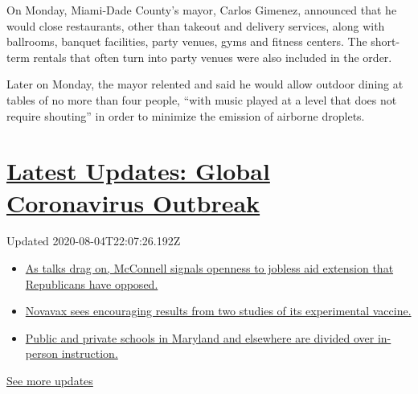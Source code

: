 On Monday, Miami-Dade County's mayor, Carlos Gimenez, announced that he
would close restaurants, other than takeout and delivery services, along
with ballrooms, banquet facilities, party venues, gyms and fitness
centers. The short-term rentals that often turn into party venues were
also included in the order.

Later on Monday, the mayor relented and said he would allow outdoor
dining at tables of no more than four people, ``with music played at a
level that does not require shouting'' in order to minimize the emission
of airborne droplets.

\hypertarget{latest-updates-global-coronavirus-outbreak}{%
\section{\texorpdfstring{\href{https://www.nytimes3xbfgragh.onion/2020/08/04/world/coronavirus-cases.html?action=click\&pgtype=Article\&state=default\&region=MAIN_CONTENT_1\&context=storylines_live_updates}{Latest
Updates: Global Coronavirus
Outbreak}}{Latest Updates: Global Coronavirus Outbreak}}\label{latest-updates-global-coronavirus-outbreak}}

Updated 2020-08-04T22:07:26.192Z

\begin{itemize}
\tightlist
\item
  \href{https://www.nytimes3xbfgragh.onion/2020/08/04/world/coronavirus-cases.html?action=click\&pgtype=Article\&state=default\&region=MAIN_CONTENT_1\&context=storylines_live_updates\#link-2daa96b5}{As
  talks drag on, McConnell signals openness to jobless aid extension
  that Republicans have opposed.}
\item
  \href{https://www.nytimes3xbfgragh.onion/2020/08/04/world/coronavirus-cases.html?action=click\&pgtype=Article\&state=default\&region=MAIN_CONTENT_1\&context=storylines_live_updates\#link-1228a480}{Novavax
  sees encouraging results from two studies of its experimental
  vaccine.}
\item
  \href{https://www.nytimes3xbfgragh.onion/2020/08/04/world/coronavirus-cases.html?action=click\&pgtype=Article\&state=default\&region=MAIN_CONTENT_1\&context=storylines_live_updates\#link-4825b93}{Public
  and private schools in Maryland and elsewhere are divided over
  in-person instruction.}
\end{itemize}

\href{https://www.nytimes3xbfgragh.onion/2020/08/04/world/coronavirus-cases.html?action=click\&pgtype=Article\&state=default\&region=MAIN_CONTENT_1\&context=storylines_live_updates}{See
more updates}

